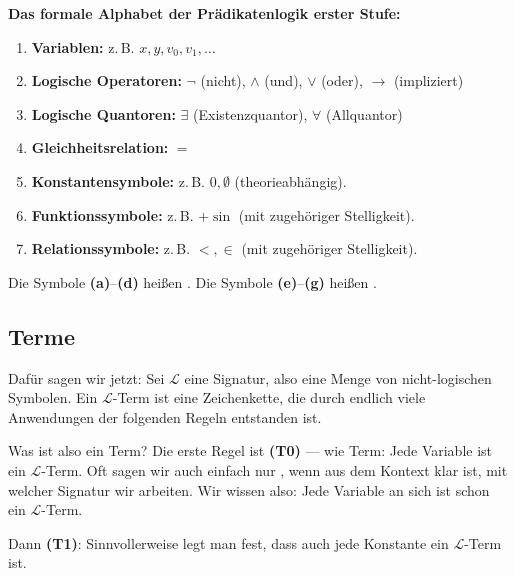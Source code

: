 \begin{math-stroke}
\textbf{Das formale Alphabet der Prädikatenlogik erster Stufe:}
\begin{enumerate}[label=\textbf{(\alph*)}]
    \item \textbf{Variablen:} z.\,B. $x, y, v_0, v_1, \dots$
    \item \textbf{Logische Operatoren:} $\neg$ (nicht), $\wedge$ (und), $\vee$ (oder), $\rightarrow$ (impliziert)
    \item \textbf{Logische Quantoren:} $\exists$ (Existenzquantor), $\forall$ (Allquantor)
    \item \textbf{Gleichheitsrelation:} $=$
    \item \textbf{Konstantensymbole:} z.\,B. $0, \emptyset$ (theorieabhängig).
    \item \textbf{Funktionssymbole:} z.\,B. $+ \sin$ (mit zugehöriger Stelligkeit).
    \item \textbf{Relationssymbole:} z.\,B. $<, \in$ (mit zugehöriger Stelligkeit).
\end{enumerate}

Die Symbole \textbf{(a)}--\textbf{(d)} heißen .
Die Symbole \textbf{(e)}--\textbf{(g)} heißen .

\end{math-stroke}

\subsection{Terme}

\begin{spoken-clean}[00:41:45 - 00:43:25]
Dafür sagen wir jetzt: Sei $\mathcal{L}$ eine Signatur, also eine Menge von nicht-logischen Symbolen. Ein $\mathcal{L}$-Term ist eine Zeichenkette, die durch endlich viele Anwendungen der folgenden Regeln entstanden ist. 

Was ist also ein Term? Die erste Regel ist \textbf{(T0)} ---  wie Term: Jede Variable ist ein $\mathcal{L}$-Term. Oft sagen wir auch einfach nur , wenn aus dem Kontext klar ist, mit welcher Signatur wir arbeiten. Wir wissen also: Jede Variable an sich ist schon ein $\mathcal{L}$-Term. 

Dann \textbf{(T1)}: Sinnvollerweise legt man fest, dass auch jede Konstante ein $\mathcal{L}$-Term ist.
\end{spoken-clean}

